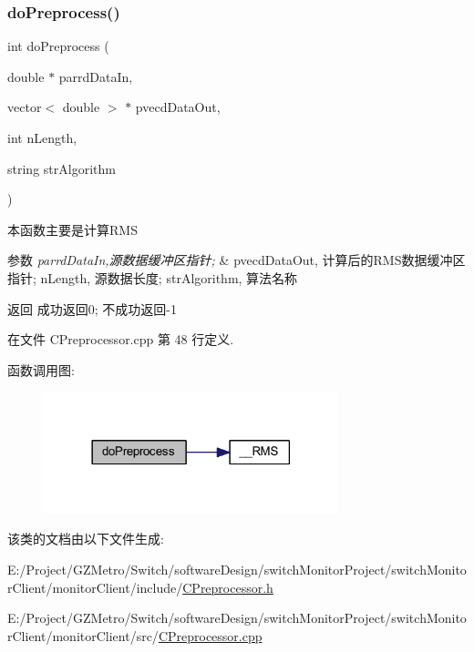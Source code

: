 \subsubsection{\texorpdfstring{do\+Preprocess()}{doPreprocess()}}
{\footnotesize\ttfamily int do\+Preprocess (\begin{DoxyParamCaption}\item[{double $\ast$}]{parrd\+Data\+In,  }\item[{vector$<$ double $>$ $\ast$}]{pvecd\+Data\+Out,  }\item[{int}]{n\+Length,  }\item[{string}]{str\+Algorithm }\end{DoxyParamCaption})}



本函数主要是计算\+R\+MS 


\begin{DoxyParams}{参数}
{\em parrd\+Data\+In,源数据缓冲区指针;} & pvecd\+Data\+Out, 计算后的\+R\+M\+S数据缓冲区指针; n\+Length, 源数据长度; str\+Algorithm, 算法名称\\
\hline
\end{DoxyParams}
\begin{DoxyReturn}{返回}
成功返回0; 不成功返回-\/1 
\end{DoxyReturn}


在文件 C\+Preprocessor.\+cpp 第 48 行定义.

函数调用图\+:\nopagebreak
\begin{figure}[H]
\begin{center}
\leavevmode
\includegraphics[width=242pt]{class_c_preprocessor_ab3442e434eabf48db4bc6b86b915e985_cgraph}
\end{center}
\end{figure}


该类的文档由以下文件生成\+:\begin{DoxyCompactItemize}
\item 
E\+:/\+Project/\+G\+Z\+Metro/\+Switch/software\+Design/switch\+Monitor\+Project/switch\+Monitor\+Client/monitor\+Client/include/\hyperlink{_c_preprocessor_8h}{C\+Preprocessor.\+h}\item 
E\+:/\+Project/\+G\+Z\+Metro/\+Switch/software\+Design/switch\+Monitor\+Project/switch\+Monitor\+Client/monitor\+Client/src/\hyperlink{_c_preprocessor_8cpp}{C\+Preprocessor.\+cpp}\end{DoxyCompactItemize}
